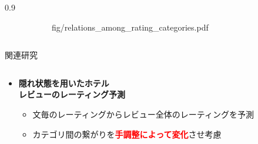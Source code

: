 \documentclass[unicode,10pt]{beamer}
\newlength{\mycolumnwidth}
\newcommand{\itemtitle}[1]{\textbf{#1}\\}
\newcommand{\fire}[1]{\textcolor{red}{\textbf{#1}}}
\begin{document}
\begin{frame}[t]
\begin{columns}[onlytextwidth,t]
\begin{column}{0.9\mycolumnwidth}
\begin{figure}
\begin{subfigure}[t]{0.5\linewidth}
                        {fig/relations_among_rating_categories.pdf}
      \end{subfigure}
      \hspace*{\fill} %
    \end{figure}
    \vspace{0.5em}
  \end{column}
\end{columns}

\begin{block}{関連研究}
  \begin{columns}[onlytextwidth,t]
    \begin{column}{0.275\textwidth}
      \begin{itemize}
        \item \itemtitle{隠れ状態を用いたホテル\\レビューのレーティング予測
                         \cite{fujitani15}}
          \begin{itemize}
            \item 文毎のレーティングからレビュー全体のレーティングを予測
            \item カテゴリ間の繋がりを\fire{手調整によって変化}させ考慮
          \end{itemize}
      \end{itemize}
    \end{column}


\end{columns}
\end{block}
\end{frame}
\end{document}
